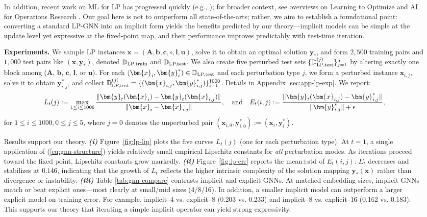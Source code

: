 \documentclass{amsart} %
\def\eqref#1{equation~\ref{#1}}
\def\vb{{\bm{b}}}
\def\vc{{\bm{c}}}
\def\vl{{\bm{l}}}
\def\vu{{\bm{u}}}
\def\vx{{\bm{x}}}
\def\vy{{\bm{y}}}
\def\mA{{\bm{A}}}
\def\sD{{\mathbb{D}}}
\theoremstyle{definition}
\theoremstyle{remark}
\renewcommand{\eqref}[1]{\textup{(\ref{#1})}}
\begin{document}
In addition, recent work on ML for LP has progressed quickly (e.g., \cite{chen2023lp,fan2023smart,sakaue2024generalization,li2024on,li2024pdhgunrolled,qian2024exploring,kuang2025accelerate,liu2024learning}); for broader context, see overviews on Learning to Optimize \cite{chen2024learning} and AI for Operations Research \cite{fan2024artificial}. Our goal here is not to outperform all state-of-the-arts; rather, we aim to establish a foundational point: converting a standard LP-GNN into an implicit form yields the benefits predicted by our theory—implicit models can be simple at the update level yet expressive at the fixed-point map, and their performance improves predictably with test-time iteration.


\textbf{Experiments.} We sample LP instances \(\vx=(\mA,\vb,\vc,\circ,\vl,\vu)\), solve it to obtain an optimal solution \(\vy_\ast\), and form \(2{,}500\) training pairs and \(1{,}000\) test pairs like $(\vx,\vy_\ast)$, denoted \(\sD_{\textup{LP,train}}\) and \(\sD_{\textup{LP,test}}\). 
We also create five perturbed test sets \(\{\sD^{(j)}_{\textup{LP,test}}\}_{j=1}^{5}\) by altering exactly one block among
(\(\mA\), \(\vb\), \(\vc\), \(\vl\), or \(\vu\)).
For each \((\vx_i,\vy_i^\ast)\in\sD_{\textup{LP,test}}\) and each perturbation type \(j\), we form a perturbed instance \(\vx_{i,j}\), solve it to obtain \(\vy^\ast_{i,j}\), and collect
\(\sD^{(j)}_{\textup{LP,test}}=\{(\vx_{i,j},\vy^\ast_{i,j})\}_{i=1}^{1000}\).
Details in Appendix \ref{sec:app-lp-exp}.
We report:
\[L_t(j) := \max_{1 \leq i \leq 1000} \frac{\| \vy_t(\vx_{i}) - \vy_t(\vx_{i,j}) \|}{ \|\vx_{i} - \vx_{i,j}\| }, \quad \textup{and}\quad E_t(i,j) := \frac{\|\vy_t(\vx_{i,j})-\vy^\ast_{i,j}\|}{\|\vy^\ast_{i,j}\|+\epsilon}, 
\]
for $1 \leq i \leq 1000, 0 \leq j \leq 5$, where $j=0$ denotes the unperturbed pair  $(\vx_{i,0},\vy^\ast_{i,0}):=(\vx_i,\vy^\ast_i)$.


Results support our theory. 
{\textbf{\textit{(i)}}} Figure~\ref{fig:lp-lip} plots the five curves \(L_t(j)\) (one for each perturbation type). At \(t=1\), a single application of \eqref{eq:gnn-structure} yields relatively small empirical Lipschitz constants for \textit{all} perturbation modes. As iterations proceed toward the fixed point, Lipschitz constants grow markedly. 
{\textbf{\textit{(ii)}}} Figure~\ref{fig:lp-err} reports the mean\(\pm\)std of \(E_t(i,j)\): \(E_t\) decreases and stabilizes at \(0.146\), indicating that the growth of \(L_t\) reflects the higher intrinsic complexity of the solution mapping \(\vy_\ast(\vx)\) rather than divergence or instability.
{\textbf{\textit{(iii)}}} Table \ref{tab:gnn-compare} contrasts implicit and explicit GNNs. At matched embedding sizes, implicit GNNs match or beat explicit ones—most clearly at small/mid sizes (4/8/16). In addition, a smaller implicit model can outperform a larger explicit model on training error. For example, implicit–4 vs. explicit–8 (0.203 vs. 0.233) and implicit–8 vs. explicit–16 (0.162 vs. 0.183). This supports our theory that iterating a simple implicit operator can yield strong expressivity. 
\end{document}
